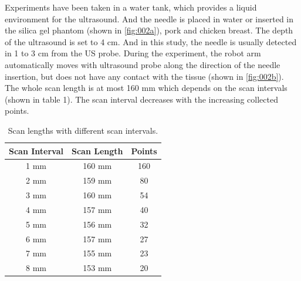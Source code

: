 \documentclass[journal,article,submit,moreauthors,pdftex]{Definitions/mdpi}
\begin{document}
Experiments have been taken in a water tank, which provides a liquid environment for the ultrasound.
And the needle is placed in water or inserted in the silica gel phantom (shown in \ref{fig:002a}), pork and chicken breast.
The depth of the ultrasound is set to 4 cm.
And in this study, the needle is usually detected in 1 to 3 cm from the US probe.
During the experiment, the robot arm automatically moves with ultrasound probe along the direction of the needle insertion, but does not have any contact with the tissue (shown in \ref{fig:002b}).
The whole scan length is at most 160 mm which depends on the scan intervals (shown in table 1). The scan interval decreases with the increasing collected points.

\begin{table}[H]
	\caption{Scan lengths with different scan intervals.}
	\centering
	\begin{tabular}{ccc}
		\rowcolor{gray!40}\textbf{Scan Interval} & \textbf{Scan Length} & \textbf{Points} \\
		\hline 1 mm                              & 160 mm               & 160             \\
		\hline 2 mm                              & 159 mm               & 80              \\
		\hline 3 mm                              & 160 mm               & 54              \\
		\hline 4 mm                              & 157 mm               & 40              \\
		\hline 5 mm                              & 156 mm               & 32              \\
		\hline 6 mm                              & 157 mm               & 27              \\
		\hline 7 mm                              & 155 mm               & 23              \\
		\hline 8 mm                              & 153 mm               & 20              \\
		\bottomrule
	\end{tabular}
\end{table}
\end{document}
